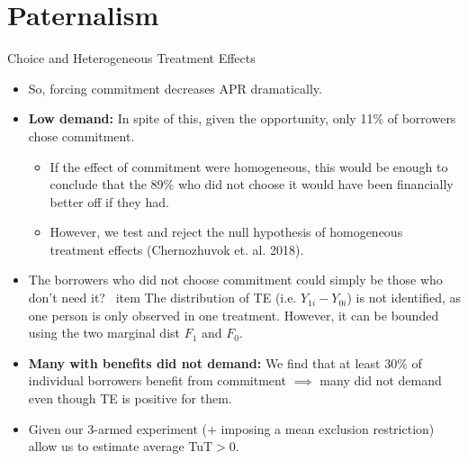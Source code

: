 \documentclass[8pt]{beamer}
\begin{document}
\section{Paternalism}
\begin{frame}{Choice and Heterogeneous Treatment Effects}
\label{choice_hte}
    \begin{itemize}
    \vfill \item  So, forcing commitment decreases APR dramatically. 
    
    \vfill \item \textbf{Low demand:} In spite of this, given the opportunity, only 11\% of borrowers chose commitment.   
    \begin{itemize}
       \pause \item If the effect of commitment were homogeneous, this would be enough to conclude that the 89\% who did not choose it would have been financially better off if they had.
       \item However, we test and reject the null hypothesis of homogeneous treatment effects (Chernozhuvok et. al. 2018).
    \end{itemize}
    
    \vfill \item The borrowers who did not choose commitment could simply be those who don’t need it?
    \pause \vfill \ item The distribution of TE (i.e. $Y_{1i}-Y_{0i}$) is not identified, as one person is only observed in one treatment. However, it can be bounded using the two marginal dist $F_1$ and $F_0$. \hyperlink{fan_park_bounds}{}
    \vfill \item \textbf{Many with benefits did not demand:} We find that at least 30\% of individual borrowers benefit from commitment $\implies$ many did not demand even though TE is positive for them.
    \vfill \item Given our 3-armed experiment (+ imposing a mean exclusion restriction) allow us to estimate average TuT$>0$. %
    \end{itemize}
\end{frame}
\end{document}
